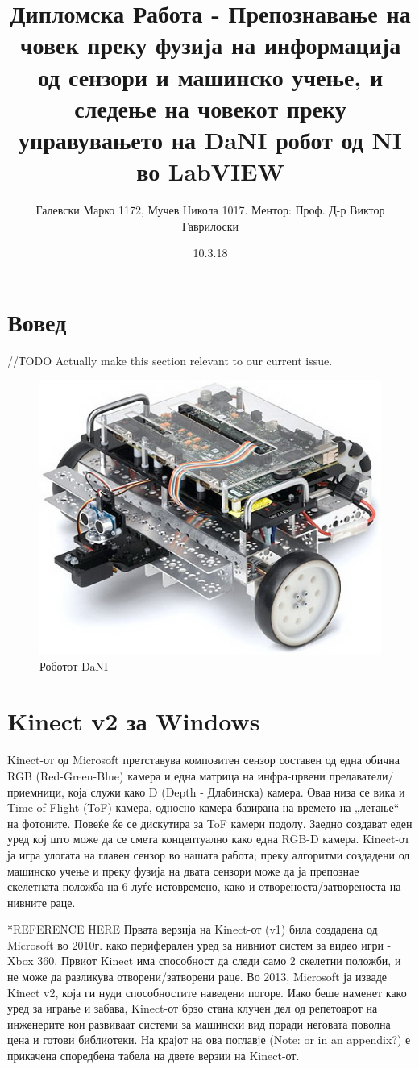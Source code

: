 \documentclass{article}
\title{Дипломска Работа - Препознавање на човек преку фузија на информација од сензори и машинско учење, и следење на човекот
				преку управувањето на  DaNI робот од NI во LabVIEW}
\date{10.3.18}
\author{Галевски Марко 1172, Мучев Никола 1017.		Ментор: Проф. Д-р Виктор Гаврилоски}
\begin{document}
    \maketitle{}
    \newpage
    \tableofcontents
    \newpage

\section{Вовед}
	//ТODO Actually make this section relevant to our current issue.
	\begin{figure}[H]
		\includegraphics[width=0.75\linewidth]{./images/dani_isometric.jpg}
		\centering
		\caption{Роботот DaNI}
		\label{fig:dani_isometric.jpg}
		\end{figure}

\newpage
\section{Kinect v2 за Windows}
	Kinect-от од Microsoft претставува композитен сензор составен од една обична RGB (Red-Green-Blue) камера и една матрица на инфра-црвени предаватели/приемници, која служи како D (Depth - Длабинска) камера. Оваа низа се вика и Time of Flight (ToF) камера, односно камера базирана на времето на „летање“ на фотоните. Повеќе ќе се дискутира за ToF камери подолу. Заедно создават еден уред кој што може да се смета концептуално како една RGB-D камера. Kinect-от ја игра улогата на главен сензор во нашата работа; преку алгоритми создадени од машинско учење и преку фузија на двата сензори може да ја препознае скелетната положба на 6 луѓе истовремено, како и отвореноста/затвореноста на нивните раце.

	*REFERENCE HERE
	Првата верзија на Kinect-от (v1) била создадена од Microsoft во 2010г. како периферален уред за нивниот систем за видео игри - Xbox 360. Првиот Kinect има способност да следи само 2 скелетни положби, и не може да разликува отворени/затворени раце. Во 2013, Microsoft ја изваде Kinect v2, која ги нуди способностите наведени погоре. Иако беше наменет како уред за играње и забава, Kinect-от брзо стана клучен дел од репетоарот на инженерите кои развиваат системи за машински вид поради неговата поволна цена и готови библиотеки. На крајот на ова поглавје (Note: or in an appendix?) е прикачена споредбена табела на двете верзии на Kinect-от.
\end{document}
